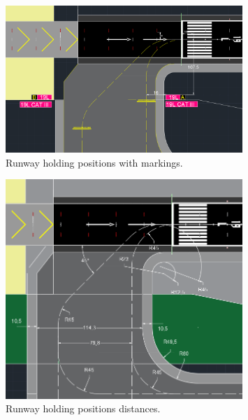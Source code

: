 	\begin{figure}[H]
		\centering
		\includegraphics[clip, trim=0cm 0cm 0cm 0cm, width=0.8\textwidth]{./images/holding/waiting}
		\caption{Runway holding positions with markings.}
		\label{waiting}
	\end{figure}
	\begin{figure}[H]
		\centering
		\includegraphics[clip, trim=0cm 0cm 0cm 0cm, width=0.8\textwidth]{./images/holding/sizes}
		\caption{Runway holding positions distances.}
		\label{sizes}
	\end{figure}
	